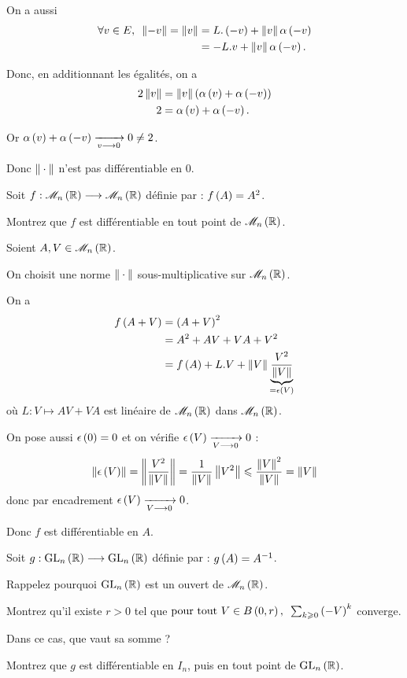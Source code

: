\begin{corr}
On a aussi \[\begin{aligned}
\quantifs{\forall v\in E}\norme{-v}=\norme{v}&=L.\paren{-v}+\norme{v}\alpha\paren{-v} \\
&=-L.v+\norme{v}\alpha\paren{-v}.
\end{aligned}\]

Donc, en additionnant les égalités, on a \[\begin{aligned}
2\norme{v}&=\norme{v}\paren{\alpha\paren{v}+\alpha\paren{-v}} \\
2&=\alpha\paren{v}+\alpha\paren{-v}.
\end{aligned}\]

Or \(\alpha\left(v\right)+\alpha\left(-v\right)\xrightarrow[v\longrightarrow0]{}0\not=2\).

Donc \(\norme{}\) n'est pas différentiable en \(0\).
\end{corr}

\begin{exo}
Soit \(f:\M{n}[\R]\to\M{n}[\R]\) définie par : \(f\left(A\right)=A^2\).

Montrez que \(f\) est différentiable en tout point de \(\M{n}[\R]\).
\end{exo}

\begin{corr}
Soient \(A,V\in\M{n}[\R]\).

On choisit une norme \(\norme{}\) sous-multiplicative sur \(\M{n}[\R]\).

On a \[\begin{aligned}
f\paren{A+V}&=\paren{A+V}^2 \\
&=A^2+AV+VA+V^2 \\
&=f\paren{A}+L.V+\norme{V}\underbrace{\dfrac{V^2}{\norme{V}}}_{=\epsilon\paren{V}}
\end{aligned}\] où \(L:V\mapsto AV+VA\) est linéaire de \(\M{n}[\R]\) dans \(\M{n}[\R]\).

On pose aussi \(\epsilon\left(0\right)=0\) et on vérifie \(\epsilon\left(V\right)\xrightarrow[V\longrightarrow0]{}0\) : \[\norme{\epsilon\paren{V}}=\norme{\dfrac{V^2}{\norme{V}}}=\dfrac{1}{\norme{V}}\norme{V^2}\leq\dfrac{\norme{V}^2}{\norme{V}}=\norme{V}\] donc par encadrement \(\epsilon\left(V\right)\xrightarrow[V\longrightarrow0]{}0\).

Donc \(f\) est différentiable en \(A\).
\end{corr}

\begin{exo}
Soit \(g:\GL{n}[\R]\to\GL{n}[\R]\) définie par : \(g\left(A\right)=A^{-1}\).

Rappelez pourquoi \(\GL{n}[\R]\) est un ouvert de \(\M{n}[\R]\).

Montrez qu'il existe \(r>0\) tel que \(\quantifs{\tpt V\in\bouleo{0}{r}}\sum_{k\geq0}\paren{-V}^k\) converge.

Dans ce cas, que vaut sa somme ?

Montrez que \(g\) est différentiable en \(I_n\), puis en tout point de \(\GL{n}[\R]\).
\end{exo}

